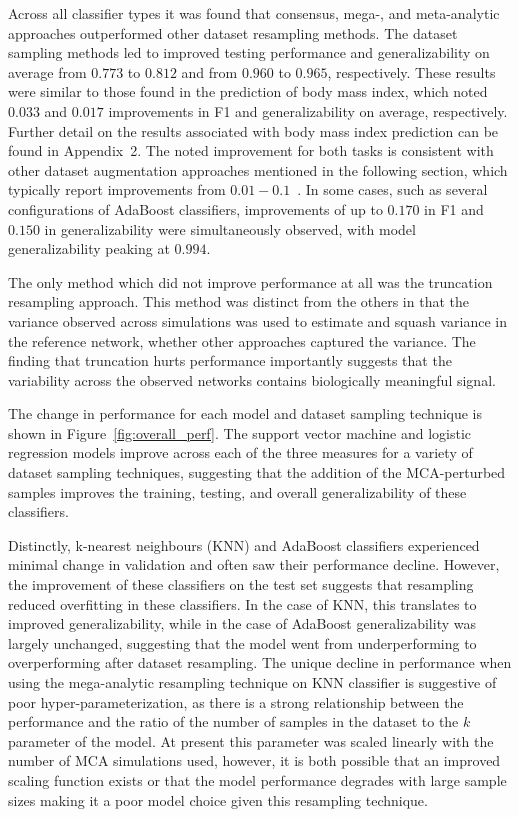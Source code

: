\documentclass[num-refs]{nbdt-article}
\begin{document}
Across all classifier types it was found that consensus, mega-, and meta-analytic approaches outperformed other dataset resampling methods. The dataset sampling methods led to improved testing performance and generalizability on average from $0.773$ to $0.812$ and from $0.960$ to $0.965$, respectively. These results were similar to those found in the prediction of body mass index, which noted $0.033$ and $0.017$ improvements in F1 and generalizability on average, respectively. Further detail on the results associated with body mass index prediction can be found in Appendix~2. The noted improvement for both tasks is consistent with other dataset augmentation approaches mentioned in the following section, which typically report improvements from $0.01-0.1$~\cite{shorten2019survey}. In some cases, such as several configurations of AdaBoost classifiers, improvements of up to $0.170$ in F1 and $0.150$ in generalizability were simultaneously observed, with model generalizability peaking at $0.994$.

The only method which did not improve performance at all was the truncation resampling approach. This method was distinct from the others in that the variance observed across simulations was used to estimate and squash variance in the reference network, whether other approaches captured the variance. The finding that truncation hurts performance importantly suggests that the variability across the observed networks contains biologically meaningful signal.

The change in performance for each model and dataset sampling technique is shown in Figure~\ref{fig:overall_perf}. The support vector machine and logistic regression models improve across each of the three measures for a variety of dataset sampling techniques, suggesting that the addition of the MCA-perturbed samples improves the training, testing, and overall generalizability of these classifiers.

Distinctly, k-nearest neighbours (KNN) and AdaBoost classifiers experienced minimal change in validation and often saw their performance decline. However, the improvement of these classifiers on the test set suggests that resampling reduced overfitting in these classifiers. In the case of KNN, this translates to improved generalizability, while in the case of AdaBoost generalizability was largely unchanged, suggesting that the model went from underperforming to overperforming after dataset resampling. The unique decline in performance when using the mega-analytic resampling technique on KNN classifier is suggestive of poor hyper-parameterization, as there is a strong relationship between the performance and the ratio of the number of samples in the dataset to the $k$ parameter of the model. At present this parameter was scaled linearly with the number of MCA simulations used, however, it is both possible that an improved scaling function exists or that the model performance degrades with large sample sizes making it a poor model choice given this resampling technique.
\end{document}
